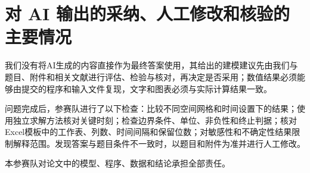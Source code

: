 \documentclass[UTF8,12pt,a4paper]{ctexart}
\begin{document}
\section{对 AI 输出的采纳、人工修改和核验的主要情况}

我们没有将AI生成的内容直接作为最终答案使用，其给出的建模建议先由我们与题目、附件和相关文献进行评估、检验与核对，再决定是否采用；数值结果必须能够由提交的程序和输入文件复现，文字和图表必须与实际计算结果一致。

问题完成后，参赛队进行了以下检查：比较不同空间网格和时间设置下的结果；使用独立求解方法核对关键时刻；检查边界条件、单位、非负性和终止判据；核对Excel模板中的工作表、列数、时间间隔和保留位数；对敏感性和不确定性结果限制解释范围。发现答案与题目条件不一致时，以题目和附件为准并进行人工修改。

本参赛队对论文中的模型、程序、数据和结论承担全部责任。
\end{document}
